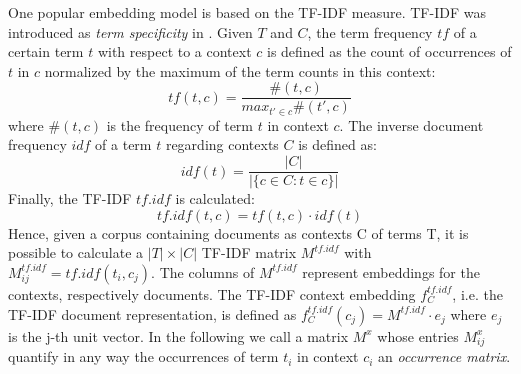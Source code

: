 One popular embedding model is based on the \ac{TF-IDF} measure. \ac{TF-IDF} was introduced as \textit{term specificity} in \textcite{sparck_jones_statistical_1972}. Given $T$ and $C$, the term frequency $tf$ of a certain term $t$ with respect to a context $c$ is defined as the count of occurrences of $t$ in $c$ normalized by the maximum of the term counts in this context:
\begin{equation}
tf(t, c) = \frac{\#(t, c)}{max_{t' \in c}\#(t', c)}
\end{equation}
where $\#(t,c)$ is the frequency of term $t$ in context $c$. The inverse document frequency $idf$ of a term $t$ regarding contexts $C$ is defined as:
\begin{equation}
idf(t) = \frac{|C|}{|\{c \in C: t \in c \}|}
\end{equation}
Finally, the \acl{TF-IDF} $tf.idf$ is calculated:
\begin{equation}
tf.idf(t, c) = tf(t, c) \cdot idf(t) %
\end{equation}
Hence, given a corpus containing documents as contexts C of terms T, it is possible to calculate a $|T| \times |C|$  \ac{TF-IDF} matrix $M^{tf.idf}$ with $M^{tf.idf}_{ij} = tf.idf(t_i, c_j)$. The columns of $M^{tf.idf}$ represent embeddings for the contexts, respectively documents. The \ac{TF-IDF} context embedding $f_C^{tf.idf}$, i.e. the \ac{TF-IDF} document representation, is defined as $f_C^{tf.idf} (c_j)= M^{tf.idf} \cdot e_j$ where $e_j$ is the j-th unit vector. In the following we call a matrix $M^x$ whose entries $M^x_{ij}$ quantify in any way the occurrences of term $t_i$ in context $c_i$ an \textit{occurrence matrix}. 

